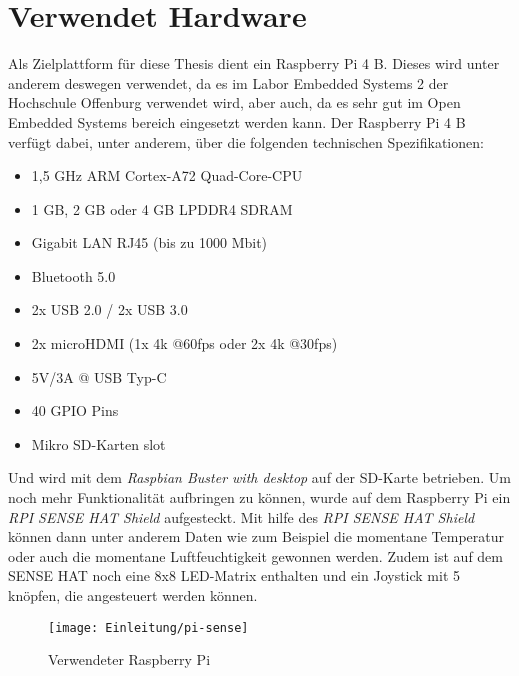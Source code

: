 \section{Verwendet Hardware}
\label{sec:verwendeteHardware}
Als Zielplattform für diese Thesis dient ein Raspberry Pi 4 B. Dieses wird unter anderem deswegen
verwendet, da es im Labor Embedded Systems 2 der Hochschule Offenburg verwendet wird, aber auch,
da es sehr gut im Open Embedded Systems bereich eingesetzt werden kann. Der Raspberry Pi 4 B
verfügt dabei, unter anderem, über die folgenden technischen Spezifikationen: \cite{RasberryPiSpecs}
\begin{itemize}
    \item 1,5 GHz ARM Cortex-A72 Quad-Core-CPU
    \item 1 GB, 2 GB oder 4 GB LPDDR4 SDRAM
    \item Gigabit LAN RJ45 (bis zu 1000 Mbit)
    \item Bluetooth 5.0
    \item 2x USB 2.0 / 2x USB 3.0
    \item 2x microHDMI (1x 4k @60fps oder 2x 4k @30fps)
    \item 5V/3A @ USB Typ-C
    \item 40 GPIO Pins
    \item Mikro SD-Karten slot
\end{itemize}
Und wird mit dem \emph{Raspbian Buster with desktop} auf der SD-Karte betrieben.
\newline
Um noch mehr Funktionalität aufbringen zu können, wurde auf dem Raspberry Pi ein
\emph{RPI SENSE HAT Shield} aufgesteckt. Mit hilfe des \emph{RPI SENSE HAT Shield} können dann
unter anderem Daten wie zum Beispiel die momentane Temperatur oder auch die momentane
Luftfeuchtigkeit gewonnen werden. Zudem ist auf dem SENSE HAT noch eine 8x8 LED-Matrix enthalten
und ein Joystick mit 5 knöpfen, die angesteuert werden können.
\begin{figure}[h]
    \centering
    \texttt{[image: Einleitung/pi-sense]}
    \caption[Raspberry Pi 4 B]{Verwendeter Raspberry Pi}
    \label{img:piSense}
\end{figure}

